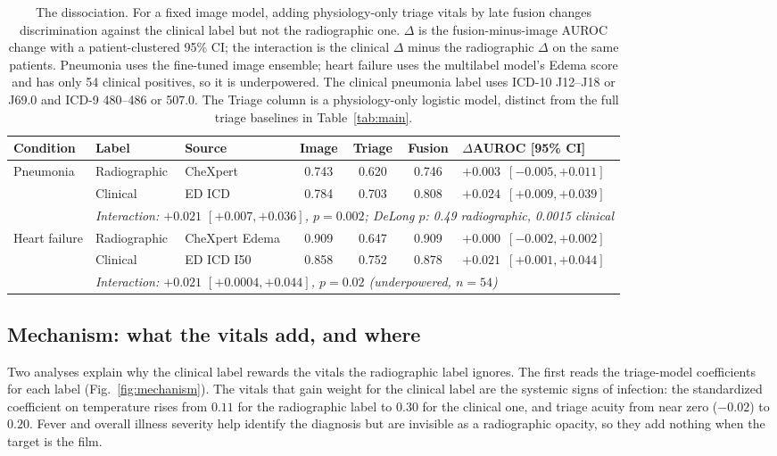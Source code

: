 \documentclass[twocolumn, final]{svjour3}
\begin{document}
\begin{table}[t]
\centering
\caption{The dissociation. For a fixed image model, adding physiology-only triage vitals by
late fusion changes discrimination against the clinical label but not the radiographic one.
$\Delta$ is the fusion-minus-image AUROC change with a patient-clustered 95\% CI; the
interaction is the clinical $\Delta$ minus the radiographic $\Delta$ on the same patients.
Pneumonia uses the fine-tuned image ensemble; heart failure uses the multilabel model's Edema
score and has only 54 clinical positives, so it is underpowered. The clinical pneumonia label
uses ICD-10 J12--J18 or J69.0 and ICD-9 480--486 or 507.0. The Triage column is a
physiology-only logistic model, distinct from the full triage baselines in
Table~\ref{tab:main}.}
\label{tab:dissociation}
\footnotesize
\setlength{\tabcolsep}{5pt}
\begin{tabular}{@{}lllcccl@{}}
\toprule
Condition & Label & Source & Image & Triage & Fusion & $\Delta$AUROC [95\% CI] \\
\midrule
\multirow{3}{*}{Pneumonia}
 & Radiographic & CheXpert & 0.743 & 0.620 & 0.746 & $+0.003$\, $[-0.005,+0.011]$ \\
 & Clinical & ED ICD & 0.784 & 0.703 & 0.808 & $+0.024$\, $[+0.009,+0.039]$ \\
 & \multicolumn{6}{l}{\emph{Interaction: $+0.021$ $[+0.007,+0.036]$, $p{=}0.002$;\; DeLong $p$: 0.49 radiographic, 0.0015 clinical}} \\
\midrule
\multirow{3}{*}{Heart failure}
 & Radiographic & CheXpert Edema & 0.909 & 0.647 & 0.909 & $+0.000$\, $[-0.002,+0.002]$ \\
 & Clinical & ED ICD I50 & 0.858 & 0.752 & 0.878 & $+0.021$\, $[+0.001,+0.044]$ \\
 & \multicolumn{6}{l}{\emph{Interaction: $+0.021$ $[+0.0004,+0.044]$, $p{=}0.02$ (underpowered, $n{=}54$)}} \\
\bottomrule
\end{tabular}
\end{table}

\subsection{Mechanism: what the vitals add, and where}
\label{subsec:mechanism}
Two analyses explain why the clinical label rewards the vitals the radiographic label
ignores. The first reads the triage-model coefficients for each label
(Fig.~\ref{fig:mechanism}). The vitals that gain weight for the clinical label are the
systemic signs of infection: the standardized coefficient on temperature rises from $0.11$
for the radiographic label to $0.30$ for the clinical one, and triage acuity from near zero
($-0.02$) to $0.20$. Fever and overall illness severity help identify the diagnosis but are
invisible as a radiographic opacity, so they add nothing when the target is the film.
\end{document}
